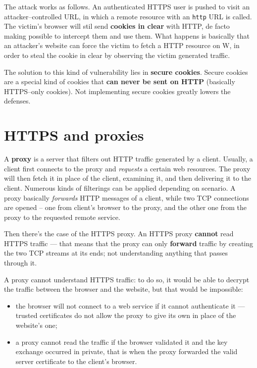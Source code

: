 \documentclass[10pt]{\classname}
\begin{document}
The attack works as follows. An authenticated HTTPS user is pushed to visit an
attacker--controlled URL, in which a remote resource with an \texttt{http} URL
is called. The victim's browser will stil send \textbf{cookies in clear} with
HTTP, de facto making possible to intercept them and use them. What happens is
basically that an attacker's website can force the victim to fetch a HTTP
resource on W, in order to steal the cookie in clear by observing the victim
generated traffic.

The solution to this kind of vulnerability lies in \textbf{secure cookies}.
Secure cookies are a special kind of cookies that \textbf{can never be sent on
HTTP} (basically HTTPS--only cookies). Not implementing secure cookies greatly
lowers the defenses.

\section{HTTPS and proxies}

A \textbf{proxy} is a server that filters out HTTP traffic generated by a
client. Usually, a client first connects to the proxy and \emph{requests} a
certain web resources. The proxy will then fetch it in place of the client,
examining it, and then delivering it to the client. Numerous kinds of
filterings can be applied depending on scenario. A proxy basically
\emph{forwards} HTTP messages of a client, while two TCP connections are opened
-- one from client's browser to the proxy, and the other one from the proxy to
the requested remote service.

Then there's the case of the HTTPS proxy. An HTTPS proxy \textbf{cannot} read
HTTPS traffic --- that means that the proxy can only \textbf{forward} traffic by
creating the two TCP streams at its ends; not understanding anything that
passes through it.

A proxy cannot understand HTTPS traffic: to do so, it would be able to decrypt
the traffic between the browser and the website, but that would be impossible:
\begin{itemize}
    \item the browser will not connect to a web service if it cannot
        authenticate it --- trusted certificates do not allow the proxy to give
        its own in place of the website's one;
    \item a proxy cannot read the traffic if the browser validated it and the
        key exchange occurred in private, that is when the proxy forwarded the
        valid server certificate to the client's browser.
\end{itemize}
\end{document}
